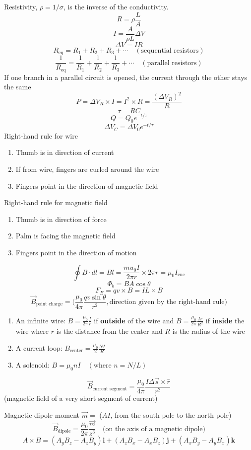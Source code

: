 \documentclass[twocolumn]{article}
\begin{document}
Resistivity, $\rho = 1/\sigma$, is the inverse of the conductivity.
\[R=\rho \frac{L}{A}\]
\[I=\frac{A}{\rho L}\Delta V\]
\[\Delta V = IR\]
\[R_\text{eq}=R_1 + R_2 + R_3 + \cdots\quad (\text{sequential resistors})\]
\[\frac{1}{R_\text{eq}}=\frac{1}{R_1} + \frac{1}{R_2} + \frac{1}{R_3} + \cdots\quad
(\text{parallel resistors})\]
If one branch in a parallel circuit is opened, the current through the other stays the same
\[P=\Delta V_R\times I = I^2\times R = \frac{{(\Delta V_R)}^2}{R}\]
\[\tau = RC\]
\[Q=Q_0 e^{-t/\tau}\]
\[\Delta V_C=\Delta V_0 e^{-t/\tau}\]
Right-hand rule for wire
\begin{enumerate}
    \item Thumb is in direction of current
    \item If from wire, fingers are curled around the wire
    \item Fingers point in the direction of magnetic field
\end{enumerate}
Right-hand rule for magnetic field
\begin{enumerate}
    \item Thumb is in direction of force
    \item Palm is facing the magnetic field
    \item Fingers point in the direction of motion
\end{enumerate}
\[\oint B\cdot dl = Bl = \frac{mu_0 I}{2\pi r}\times 2\pi r = \mu_0 I_\text{enc}\]
\[\Phi_b = BA\cos\theta\]
\[F_B=qv\times B=IL\times B\]
\[\vec{B}_\text{point charge}=\Big(\frac{\mu_0}{4\pi}\frac{qv\sin \theta}{r^2},
\text{direction given by the right-hand rule}\Big)\]
\begin{enumerate}
    \item An infinite wire: $B=\frac{\mu_0}{2\pi}\frac{I}{r}$ if \textbf{outside} of the wire and
    $B=\frac{\mu_0}{2\pi}\frac{Ir}{R^2}$ if \textbf{inside} the wire where $r$ is the distance from
    the center and $R$ is the radius of the wire
    \item A current loop: $B_\text{center}=\frac{\mu_0}{2}\frac{NI}{R}$
    \item A solenoid: $B=\mu_0 nI\quad(\text{where }n=N/L)$
\end{enumerate}

\[\vec{B}_\text{current segment}=\frac{\mu_0}{4\pi}\frac{I\Delta \vec{s}\times \hat{r}}{r^2}\]
\quad(magnetic field of a very short segment of current)
\vspace{1em}

Magnetic dipole moment $\vec{m}=$ ($AI$, from the south pole to the north pole)
\[\vec{B}_\text{dipole}=\frac{\mu_0}{2\pi}\frac{\vec{m}}{z^3}\quad
\text{(on the axis of a magnetic dipole)}\]
\[A\times B = (A_yB_z - A_zB_y)\mathbf{i}+(A_zB_x-A_xB_z)\mathbf{j}+(A_xB_y-A_yB_x)\mathbf{k}\]
\end{document}
